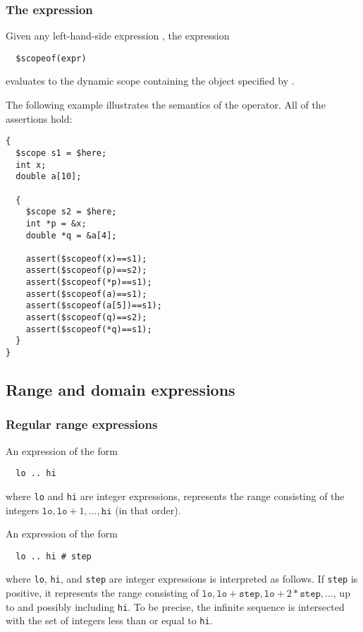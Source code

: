 \subsubsection{The \cscopeof{} expression}

Given any left-hand-side expression , the expression
\begin{verbatim}
  $scopeof(expr)
\end{verbatim}
evaluates to the dynamic scope containing the object specified by
.

The following example illustrates the semantics of the \cscopeof{}
operator.  All of the assertions hold:
\begin{verbatim}
{
  $scope s1 = $here;
  int x;
  double a[10];

  {
    $scope s2 = $here;
    int *p = &x;
    double *q = &a[4];

    assert($scopeof(x)==s1);
    assert($scopeof(p)==s2);
    assert($scopeof(*p)==s1);
    assert($scopeof(a)==s1);
    assert($scopeof(a[5])==s1);
    assert($scopeof(q)==s2);
    assert($scopeof(*q)==s1);
  }
}  
\end{verbatim}

\subsection{Range and domain expressions}

\subsubsection{Regular range expressions}
\label{sec:range_expr}

An expression of the form
\begin{verbatim}
  lo .. hi
\end{verbatim}
where \texttt{lo} and \texttt{hi} are integer expressions, represents
the range consisting of the integers $\texttt{lo}, \texttt{lo}+1,
\ldots, \texttt{hi}$ (in that order).

An expression of the form
\begin{verbatim}
  lo .. hi # step
\end{verbatim}
where \texttt{lo}, \texttt{hi}, and \texttt{step} are integer
expressions is interpreted as follows.  If \texttt{step} is positive,
it represents the range consisting of $\texttt{lo},
\texttt{lo}+\texttt{step}, \texttt{lo}+2*\texttt{step}, \ldots$, up to
and possibly including \texttt{hi}.  To be precise, the infinite
sequence is intersected with the set of integers less than or equal to
\texttt{hi}.

